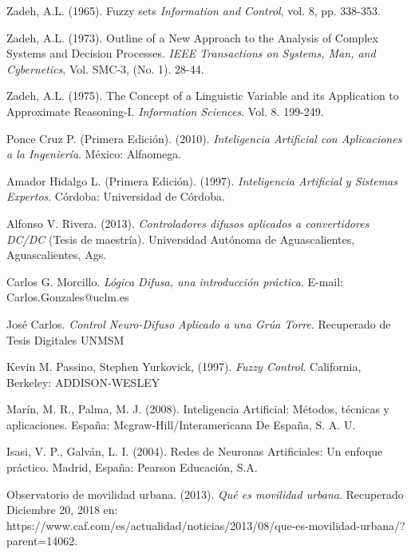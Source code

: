 \begin{thebibliography}{99}
	 Zadeh, A.L. (1965). Fuzzy sets \emph{Information and Control}, vol. 8, pp. 338-353.
	
	 Zadeh, A.L. (1973). Outline of a New Approach to the Analysis of Complex Systems and Decision Processes. \emph{IEEE Transactions on Systems, Man, and Cybernetics}, Vol. SMC-3, (No. 1). 28-44.
	
	 Zadeh, A.L. (1975). The Concept of a Linguistic Variable and its Application to Approximate Reasoning-I. \emph{Information Sciences}. Vol. 8. 199-249.
	
	 Ponce Cruz P. (Primera Edición). (2010).
		\emph{Inteligencia Artificial con Aplicaciones a la Ingeniería}. México: Alfaomega.
	
	 Amador Hidalgo L. (Primera Edición). (1997).
		\emph{Inteligencia Artificial y Sistemas Expertos}. Córdoba: Universidad de Córdoba.
		
	 Alfonso V. Rivera. (2013). \emph{Controladores difusos aplicados a convertidores DC/DC} (Tesis de maestría). Universidad Autónoma de Aguascalientes, Aguascalientes, Ags.
	
	 Carlos G. Morcillo. \emph{Lógica Difusa, una introducción práctica}. E-mail: Carlos.Gonzales@uclm.es
	
	 José Carlos. \emph{Control Neuro-Difuso Aplicado a una Grúa Torre}. Recuperado de Tesis Digitales UNMSM
	
	 Kevin M. Passino, Stephen Yurkovick, (1997). \emph{Fuzzy Control}. California, Berkeley: ADDISON-WESLEY
	
	 Marín, M. R., Palma, M. J. (2008). Inteligencia Artificial: Métodos, técnicas y aplicaciones. España: Mcgraw-Hill/Interamericana De España, S. A. U.
	
	 Isasi, V. P., Galván, L. I. (2004). Redes de Neuronas Artificiales: Un enfoque práctico. Madrid, España: Pearson Educación, S.A.
	
	 Observatorio de movilidad urbana. (2013). \emph{Qué es movilidad urbana}. Recuperado Diciembre 20, 2018 en: https://www.caf.com/es/actualidad/noticias/2013/08/que-es-movilidad-urbana/?parent=14062.
	
\end{thebibliography}

